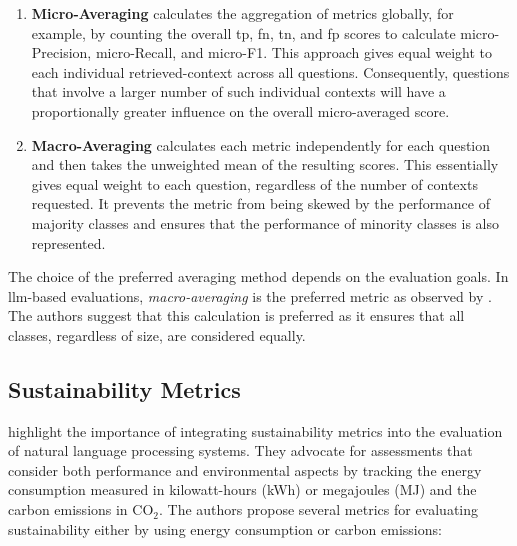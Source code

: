\begin{enumerate}
    \item \textbf{Micro-Averaging} calculates the aggregation of metrics globally, for example, by counting the overall \gls{tp}, \gls{fn}, \gls{tn}, and \gls{fp} scores to calculate micro-Precision, micro-Recall, and micro-F1. This approach gives equal weight to each individual retrieved-context across all questions. Consequently, questions that involve a larger number of such individual contexts will have a proportionally greater influence on the overall micro-averaged score.
    
    \item \textbf{Macro-Averaging} calculates each metric independently for each question and then takes the unweighted mean of the resulting scores. This essentially gives equal weight to each question, regardless of the number of contexts requested. It prevents the metric from being skewed by the performance of majority classes and ensures that the performance of minority classes is also represented.
\end{enumerate}

The choice of the preferred averaging method depends on the evaluation goals. In \gls{llm}-based evaluations, \emph{macro-averaging} is the preferred metric as observed by \textcite{hu_unveiling_2024}. The authors suggest that this calculation is preferred as it ensures that all classes, regardless of size, are considered equally.


\subsection{Sustainability Metrics}

\textcite{kaplan_responsible_2025} highlight the importance of integrating sustainability metrics into the evaluation of natural language processing systems. They advocate for assessments that consider both performance and environmental aspects by tracking the energy consumption measured in kilowatt-hours (kWh) or megajoules (MJ) and the carbon emissions in CO$_2$. The authors propose several metrics for evaluating sustainability either by using energy consumption or carbon emissions:


